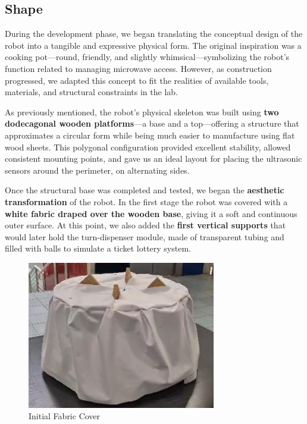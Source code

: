 \subsection{Shape}

During the development phase, we began translating the conceptual design of the robot into a tangible and expressive physical form. The original inspiration was a cooking pot—round, friendly, and slightly whimsical—symbolizing the robot's function related to managing microwave access. However, as construction progressed, we adapted this concept to fit the realities of available tools, materials, and structural constraints in the lab.

As previously mentioned, the robot's physical skeleton was built using \textbf{two dodecagonal wooden platforms}—a base and a top—offering a structure that approximates a circular form while being much easier to manufacture using flat wood sheets. This polygonal configuration provided excellent stability, allowed consistent mounting points, and gave us an ideal layout for placing the ultrasonic sensors around the perimeter, on alternating sides.

Once the structural base was completed and tested, we began the \textbf{aesthetic transformation} of the robot. In the first stage the robot was covered with a \textbf{white fabric draped over the wooden base}, giving it a soft and continuous outer surface. At this point, we also added the \textbf{first vertical supports} that would later hold the turn-dispenser module, made of transparent tubing and filled with balls to simulate a ticket lottery system.

\begin{figure}[H]
    \centering
    \includegraphics[width=0.6\linewidth]{../ReportMovementModule/images/Aspose.Words.728084da-df58-4b9d-a372-f65cffbdb23d.026.png}
    \caption{Initial Fabric Cover}
\end{figure}

